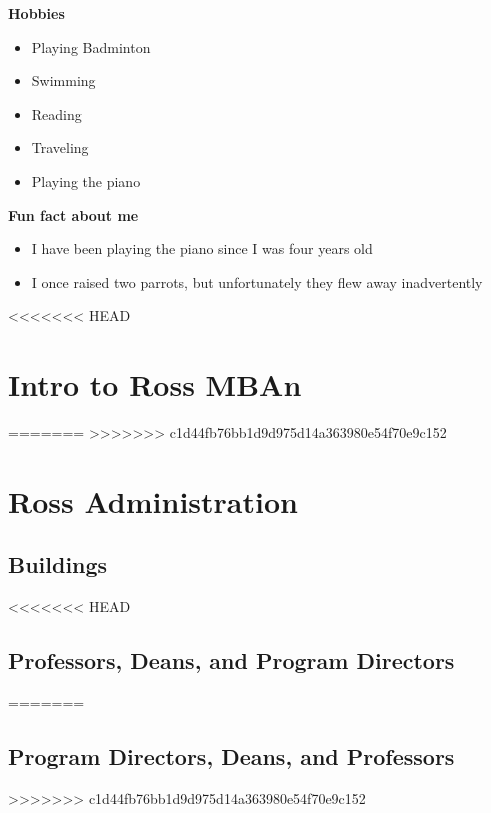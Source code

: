 \documentclass[
]{book}
\begin{document}
\textbf{Hobbies}

\begin{itemize}
\item
  Playing Badminton
\item
  Swimming
\item
  Reading
\item
  Traveling
\item
  Playing the piano
\end{itemize}

\textbf{Fun fact about me}

\begin{itemize}
\item
  I have been playing the piano since I was four years old
\item
  I once raised two parrots, but unfortunately they flew away inadvertently
\end{itemize}

<<<<<<< HEAD
\hypertarget{intro-to-ross-mban}{%
\chapter{Intro to Ross MBAn}\label{intro-to-ross-mban}}

=======
>>>>>>> c1d44fb76bb1d9d975d14a363980e54f70e9c152
\hypertarget{ross-administration}{%
\chapter{Ross Administration}\label{ross-administration}}

\hypertarget{buildings}{%
\section{Buildings}\label{buildings}}

<<<<<<< HEAD
\hypertarget{professors-deans-and-program-directors}{%
\section{Professors, Deans, and Program Directors}\label{professors-deans-and-program-directors}}
=======
\hypertarget{program-directors-deans-and-professors}{%
\section{Program Directors, Deans, and Professors}\label{program-directors-deans-and-professors}}
>>>>>>> c1d44fb76bb1d9d975d14a363980e54f70e9c152
\end{document}
